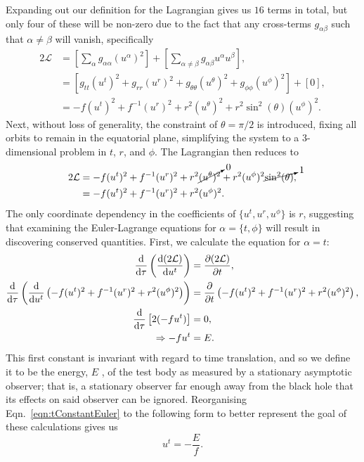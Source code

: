Expanding out our definition for the Lagrangian gives us $16$ terms in total, but only four of these will be non-zero due to the fact that any cross-terms $g_{\alpha\beta}$ such that $\alpha \neq \beta$ will vanish, specifically
\begin{align}
    2\mathcal{L}&=\left[\sum_{\alpha}g_{\alpha\alpha}(u^\alpha)^2\right]+\left[\sum_{\alpha\neq\beta}g_{\alpha\beta}u^\alpha u^\beta\right],\\
    &=\left[g_{tt}(u^t)^2+g_{rr}(u^r)^2+g_{\theta\theta}(u^\theta)^2+g_{\phi\phi}(u^\phi)^2\right]+\left[0\right],\\
    &=-f(u^t)^2+f^{-1}(u^r)^2+r^2(u^\theta)^2+r^2\sin^2(\theta)(u^\phi)^2.
\end{align}
Next, without loss of generality, the constraint of $\theta=\pi/2$ is introduced, fixing all orbits to remain in the equatorial plane, simplifying the system to a 3-dimensional problem in $t$, $r$, and $\phi$.
The Lagrangian then reduces to
\begin{align}
2\mathcal{L}&=-f(u^t)^2+f^{-1}(u^r)^2+r^2\cancelto{0}{(u^\theta)^2}+r^2(u^\phi)^2\cancelto{1}{\sin^2(\theta)},\\
&=-f(u^t)^2+f^{-1}(u^r)^2+r^2(u^\phi)^2 \label{eqn:reduclagran}.
\end{align}
The only coordinate dependency in the coefficients of $\{u^t, u^r, u^\phi\}$ is $r$, suggesting that examining the Euler-Lagrange equations for $\alpha=\{t,\phi\}$ will result in discovering conserved quantities.
First, we calculate the equation for $\alpha=t$:
\begin{align}
    \dv{}{\tau}\left(\dv{(2\mathcal{L})}{u^t} \right)&=\pdv{(2\mathcal{L})}{t},\\
    \dv{}{\tau}\left(\dv{}{u^t}\left( -f(u^t)^2+f^{-1}(u^r)^2+r^2(u^\phi)^2\right) \right)&=\pdv{}{t}\left( -f(u^t)^2+f^{-1}(u^r)^2+r^2(u^\phi)^2\right),\\
    \dv{}{\tau}\left[2(-fu^t) \right]&=0,\\
    \Rightarrow -fu^t&=E. \label{eqn:tConstantEuler}
\end{align}
This first constant is invariant with regard to time translation, and so we define it to be the energy, $E$ \cite{introCondensed}, of the test body as measured by a stationary asymptotic observer; that is, a stationary observer far enough away from the black hole that its effects on said observer can be ignored.
Reorganising Eqn.~\eqref{eqn:tConstantEuler} to the following form to better represent the goal of these calculations gives us
\begin{equation}\label{eqn:ut}
u^t=-\frac{E}{f}.
\end{equation}
